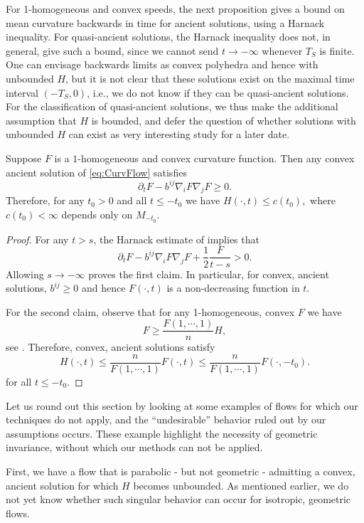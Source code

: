 \documentclass{amsart}
\begin{document}
For 1-homogeneous and convex speeds, the next proposition gives a bound on mean curvature backwards in time for ancient solutions, using a Harnack inequality. For quasi-ancient solutions, the Harnack inequality does not, in general, give such a bound, since we cannot send \(t \to -\infty\) whenever \(T_S\) is finite. One can envisage backwards limits as convex polyhedra and hence with unbounded \(H\), but it is not clear that these solutions exist on the maximal time interval \((-T_S, 0)\), i.e., we do not know if they can be quasi-ancient solutions. For the classification of quasi-ancient solutions, we thus make the additional assumption that \(H\) is bounded, and defer the question of whether solutions with unbounded \(H\) can exist as very interesting study for a later date.

\begin{prop}
\label{cor:boundedH}
Suppose $F$ is a \(1\)-homogeneous and convex curvature function. Then any convex ancient solution of \eqref{eq:CurvFlow} satisfies
\[\partial_t F-b^{ij}\nabla_i F \nabla_j F \geq 0.\]
Therefore, for any $t_0 > 0$ and all $t\le -t_0$ we have
$H(\cdot,t)\leq c(t_0),$
where $c(t_0)<\infty$ depends only on $M_{-t_0}.$
\end{prop}
\begin{proof}
For any $t>s$, the  Harnack estimate of \cite[Theorem 1]{BryanIvakiScheuer:12/2015} implies that
$$\partial_t F-b^{ij}\nabla_i F\nabla_j F+\frac{1}{2}\frac{F}{t-s}>0.$$
Allowing $s\to-\infty$ proves the first claim. In particular, for convex, ancient solutions, $b^{ij} \geq 0$ and hence $F(\cdot, t)$ is a non-decreasing function in $t$.

For the second claim, observe that for any 1-homogeneous, convex $F$ we have \[F\ge \frac{F(1,\cdots,1)}{n}H,\]
see \cite[Lemma~2.2.20]{Gerhardt:/2006}. Therefore, convex, ancient solutions satisfy
\[H(\cdot,t)\leq \frac{n}{F(1,\cdots,1)}F(\cdot,t)\leq \frac{n}{F(1,\cdots,1)}F(\cdot,-t_0). \]
for all \(t \leq -t_0\).
\end{proof}

Let us round out this section by looking at some examples of flows for which our techniques do not apply, and the ``undesirable'' behavior ruled out by our assumptions occurs. These example highlight the necessity of geometric invariance,  without which our methods can not be applied.

First, we have a flow that is parabolic - but not geometric - admitting a convex, ancient solution for which \(H\) becomes unbounded. As mentioned earlier, we do not yet know whether such singular behavior can occur for isotropic, geometric flows.
\end{document}
